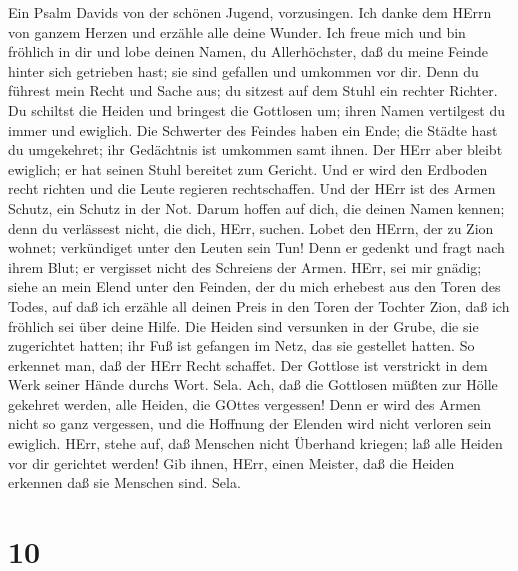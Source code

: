 Ein Psalm Davids von der schönen Jugend, vorzusingen.
 Ich danke dem HErrn von ganzem Herzen und erzähle alle
deine Wunder.  Ich freue mich und bin fröhlich in dir und
lobe deinen Namen, du Allerhöchster,  daß du meine Feinde
hinter sich getrieben hast; sie sind gefallen und umkommen vor dir.
 Denn du führest mein Recht und Sache aus; du sitzest auf
dem Stuhl ein rechter Richter.  Du schiltst die Heiden und
bringest die Gottlosen um; ihren Namen vertilgest du immer und ewiglich.
 Die Schwerter des Feindes haben ein Ende; die Städte hast
du umgekehret; ihr Gedächtnis ist umkommen samt ihnen.  Der
HErr aber bleibt ewiglich; er hat seinen Stuhl bereitet zum Gericht.
 Und er wird den Erdboden recht richten und die Leute
regieren rechtschaffen.  Und der HErr ist des Armen Schutz,
ein Schutz in der Not.  Darum hoffen auf dich, die deinen
Namen kennen; denn du verlässest nicht, die dich, HErr, suchen.
 Lobet den HErrn, der zu Zion wohnet; verkündiget unter den
Leuten sein Tun!  Denn er gedenkt und fragt nach ihrem
Blut; er vergisset nicht des Schreiens der Armen.  HErr,
sei mir gnädig; siehe an mein Elend unter den Feinden, der du mich
erhebest aus den Toren des Todes,  auf daß ich erzähle all
deinen Preis in den Toren der Tochter Zion, daß ich fröhlich sei über
deine Hilfe.  Die Heiden sind versunken in der Grube, die
sie zugerichtet hatten; ihr Fuß ist gefangen im Netz, das sie gestellet
hatten.  So erkennet man, daß der HErr Recht schaffet. Der
Gottlose ist verstrickt in dem Werk seiner Hände durchs Wort. Sela.
 Ach, daß die Gottlosen müßten zur Hölle gekehret werden,
alle Heiden, die GOttes vergessen!  Denn er wird des Armen
nicht so ganz vergessen, und die Hoffnung der Elenden wird nicht
verloren sein ewiglich.  HErr, stehe auf, daß Menschen
nicht Überhand kriegen; laß alle Heiden vor dir gerichtet werden!
 Gib ihnen, HErr, einen Meister, daß die Heiden erkennen
daß sie Menschen sind. Sela.

\hypertarget{section-9}{%
\section{10}\label{section-9}}

